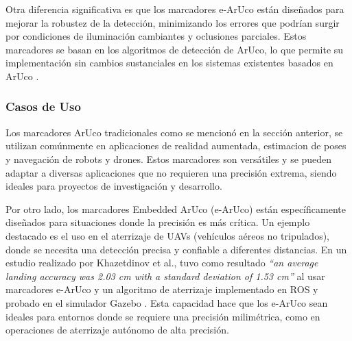     Otra diferencia significativa es que los marcadores e-ArUco están diseñados para mejorar la robustez de la detección, minimizando los errores que podrían surgir por condiciones de iluminación cambiantes y oclusiones parciales. Estos marcadores se basan en los algoritmos de detección de ArUco, lo que permite su implementación sin cambios sustanciales en los sistemas existentes basados en ArUco \cite{khazetdinov2021}.

    \subsubsection{Casos de Uso}

    Los marcadores ArUco tradicionales como se mencionó en la sección anterior, se utilizan comúnmente en aplicaciones de realidad aumentada, estimacion de poses y navegación de robots y drones. Estos marcadores son versátiles y se pueden adaptar a diversas aplicaciones que no requieren una precisión extrema, siendo ideales para proyectos de investigación y desarrollo.

    Por otro lado, los marcadores Embedded ArUco (e-ArUco) están específicamente diseñados para situaciones donde la precisión es más crítica. Un ejemplo destacado es el uso en el aterrizaje de UAVs (vehículos aéreos no tripulados), donde se necesita una detección precisa y confiable a diferentes distancias. En un estudio realizado por Khazetdinov et al., tuvo como resultado \textit{“an average landing accuracy was 2.03 cm with a standard deviation of 1.53 cm”} al usar marcadores e-ArUco y un algoritmo de aterrizaje implementado en ROS y probado en el simulador Gazebo \cite{khazetdinov2021}. Esta capacidad hace que los e-ArUco sean ideales para entornos donde se requiere una precisión milimétrica, como en operaciones de aterrizaje autónomo de alta precisión.


